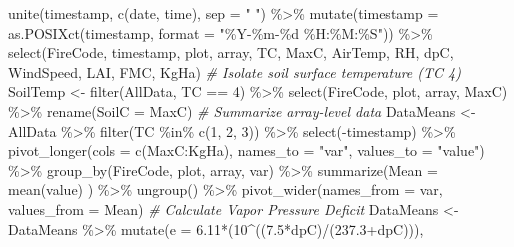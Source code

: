 \documentclass[
]{article}
\newenvironment{Shaded}{\begin{snugshade}}{\end{snugshade}}
\newcommand{\AttributeTok}[1]{\textcolor[rgb]{0.77,0.63,0.00}{#1}}
\newcommand{\CommentTok}[1]{\textcolor[rgb]{0.56,0.35,0.01}{\textit{#1}}}
\newcommand{\DecValTok}[1]{\textcolor[rgb]{0.00,0.00,0.81}{#1}}
\newcommand{\FloatTok}[1]{\textcolor[rgb]{0.00,0.00,0.81}{#1}}
\newcommand{\FunctionTok}[1]{\textcolor[rgb]{0.00,0.00,0.00}{#1}}
\newcommand{\NormalTok}[1]{#1}
\newcommand{\OtherTok}[1]{\textcolor[rgb]{0.56,0.35,0.01}{#1}}
\newcommand{\SpecialCharTok}[1]{\textcolor[rgb]{0.00,0.00,0.00}{#1}}
\newcommand{\StringTok}[1]{\textcolor[rgb]{0.31,0.60,0.02}{#1}}
\begin{document}
\begin{Shaded}
\begin{Highlighting}[]
    \FunctionTok{unite}\NormalTok{(timestamp, }\FunctionTok{c}\NormalTok{(date, time), }\AttributeTok{sep =} \StringTok{" "}\NormalTok{) }\SpecialCharTok{\%\textgreater{}\%}
    \FunctionTok{mutate}\NormalTok{(}\AttributeTok{timestamp =} \FunctionTok{as.POSIXct}\NormalTok{(timestamp, }\AttributeTok{format =} \StringTok{"\%Y{-}\%m{-}\%d \%H:\%M:\%S"}\NormalTok{)) }\SpecialCharTok{\%\textgreater{}\%}
        \FunctionTok{select}\NormalTok{(FireCode, timestamp, plot, array, TC, MaxC, }
\NormalTok{               AirTemp, RH, dpC, WindSpeed, }
\NormalTok{               LAI, FMC, KgHa) }
\CommentTok{\# Isolate soil surface temperature (TC 4)}
\NormalTok{  SoilTemp }\OtherTok{\textless{}{-}}
    \FunctionTok{filter}\NormalTok{(AllData, TC }\SpecialCharTok{==} \DecValTok{4}\NormalTok{) }\SpecialCharTok{\%\textgreater{}\%}
      \FunctionTok{select}\NormalTok{(FireCode, plot, array, MaxC) }\SpecialCharTok{\%\textgreater{}\%}
        \FunctionTok{rename}\NormalTok{(}\AttributeTok{SoilC =}\NormalTok{ MaxC)}
\CommentTok{\# Summarize array{-}level data }
\NormalTok{  DataMeans }\OtherTok{\textless{}{-}} 
\NormalTok{    AllData }\SpecialCharTok{\%\textgreater{}\%}
      \FunctionTok{filter}\NormalTok{(TC }\SpecialCharTok{\%in\%} \FunctionTok{c}\NormalTok{(}\StringTok{\textquotesingle{}1\textquotesingle{}}\NormalTok{, }\StringTok{\textquotesingle{}2\textquotesingle{}}\NormalTok{, }\StringTok{\textquotesingle{}3\textquotesingle{}}\NormalTok{)) }\SpecialCharTok{\%\textgreater{}\%} 
      \FunctionTok{select}\NormalTok{(}\SpecialCharTok{{-}}\NormalTok{timestamp) }\SpecialCharTok{\%\textgreater{}\%}
      \FunctionTok{pivot\_longer}\NormalTok{(}\AttributeTok{cols =} \FunctionTok{c}\NormalTok{(MaxC}\SpecialCharTok{:}\NormalTok{KgHa), }
                   \AttributeTok{names\_to =} \StringTok{"var"}\NormalTok{,}
                   \AttributeTok{values\_to =} \StringTok{"value"}\NormalTok{) }\SpecialCharTok{\%\textgreater{}\%}
      \FunctionTok{group\_by}\NormalTok{(FireCode, plot, array, var) }\SpecialCharTok{\%\textgreater{}\%}
        \FunctionTok{summarize}\NormalTok{(}\AttributeTok{Mean =} \FunctionTok{mean}\NormalTok{(value) ) }\SpecialCharTok{\%\textgreater{}\%}
      \FunctionTok{ungroup}\NormalTok{() }\SpecialCharTok{\%\textgreater{}\%}
      \FunctionTok{pivot\_wider}\NormalTok{(}\AttributeTok{names\_from =}\NormalTok{ var, }
                  \AttributeTok{values\_from =}\NormalTok{ Mean) }
\CommentTok{\# Calculate Vapor Pressure Deficit}
\NormalTok{  DataMeans }\OtherTok{\textless{}{-}} 
\NormalTok{    DataMeans }\SpecialCharTok{\%\textgreater{}\%}
      \FunctionTok{mutate}\NormalTok{(}\AttributeTok{e  =} \FloatTok{6.11}\SpecialCharTok{*}\NormalTok{(}\DecValTok{10}\SpecialCharTok{\^{}}\NormalTok{((}\FloatTok{7.5}\SpecialCharTok{*}\NormalTok{dpC)}\SpecialCharTok{/}\NormalTok{(}\FloatTok{237.3}\SpecialCharTok{+}\NormalTok{dpC))), }

\end{Highlighting}
\end{Shaded}
\end{document}
